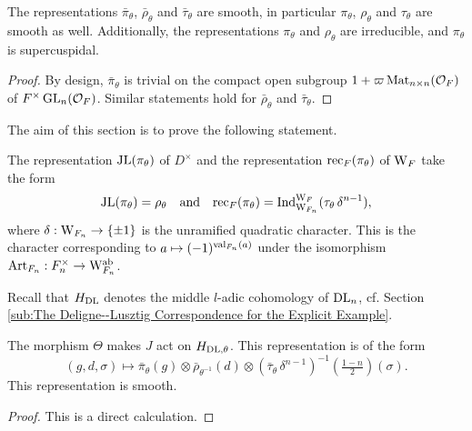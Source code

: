 \documentclass[../main.tex]{subfiles}
\begin{document}
\begin{lem}\label{lem:BarRepsAreSmooth}
  The representations $\bar \pi_\theta$, $\bar \rho_\theta$ and $\bar
  \tau_\theta$ are smooth, in particular
  $\pi_\theta$, $\rho_\theta$ and $\tau_\theta$ are smooth as well. Additionally, the
  representations $\pi_\theta$ and $\rho_\theta$ are irreducible, and
  $\pi_\theta$ is supercuspidal.
\begin{proof}
  By design, $\bar \pi_\theta$ is trivial on the compact open subgroup $1 +
  \varpi \operatorname{Mat}_{n \times n}(\mathcal{O}_F)$ of $F^\times \operatorname{GL}_n(\mathcal{O}_F)$. Similar
  statements hold for $\bar \rho_\theta$
  and $\bar \tau_\theta$. 
\end{proof}
\end{lem}

The aim of this section is to prove the following statement.
\begin{thm}\label{thm:MainRes1}
  The representation $\mathrm{JL}(\pi_\theta)$ of $D^\times$ and the representation
  $\mathrm{rec}_F(\pi_\theta)$ of $\mathrm W_F$ take the form
  \begin{equation*}
    \mathrm{JL}(\pi_\theta) = \rho_{\theta}
    \quad \text{and} \quad \mathrm{rec}_F(\pi_\theta) = \mathrm{Ind}_{\mathrm W_{F_n}}^{\mathrm W_F} 
    (\tau_\theta \, \delta^{n-1}),
  \end{equation*}
  where $\delta: \mathrm W_{F_n} \to \{\pm 1\}$ is the unramified quadratic
  character. This is the character corresponding to $a \mapsto
  (-1)^{\mathrm{val}_{F_n}(a)}$ under the isomorphism $\mathrm{Art}_{F_n}: F_n^\times \to
  \mathrm W_{F_n}^{\mathrm{ab}}$. 
\end{thm}


Recall that $H_{\mathrm{DL}}$ denotes the middle $l$-adic cohomology of 
$\mathrm{DL}_n$, cf. Section \ref{sub:The Deligne--Lusztig Correspondence for the
Explicit Example}.
\begin{lem}
  The morphism $\Theta$ makes $J$ act on ${H}_{\mathrm{DL},\theta}$. This representation is 
  of the form 
  \begin{equation*}
    (g,d,\sigma) \mapsto \bar \pi_\theta(g) \otimes \bar \rho_{\theta^{-1}}(d)
    \otimes \left(\bar \tau_\theta \, \delta^{n-1}\right)^{-1}(\tfrac{1-n}2)(\sigma).
  \end{equation*}
  This representation is smooth.
\begin{proof}
  This is a direct calculation.
\end{proof}
\end{lem}
\end{document}
